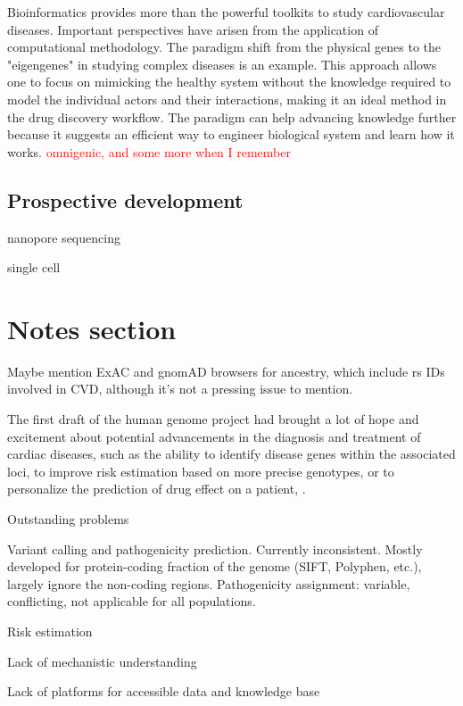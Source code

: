 \documentclass[letter]{bioinfo}
\newcommand{\comment}[1]{\textcolor{red}{#1}}
\begin{document}
	Bioinformatics provides more than the powerful toolkits to study cardiovascular diseases. Important perspectives have arisen from the application of computational methodology. The paradigm shift from the physical genes to the "eigengenes" in studying complex diseases \citep{Weiss:2012:Good} is an example. This approach allows one to focus on mimicking the healthy system without the knowledge required to model the individual actors and their interactions, making it an ideal method in the drug discovery workflow. The paradigm can help advancing knowledge further because it suggests an efficient way to engineer biological system and learn how it works.
	\comment{omnigenic, and some more when I remember}
	
	
	\subsection{Prospective development}
	
	nanopore sequencing
	
	single cell
	
	\section*{Notes section}
	
	Maybe mention ExAC and gnomAD browsers for ancestry, which include rs IDs involved in CVD, although it's not a pressing issue to mention.
	
	The first draft of the human genome project had brought a lot of hope and excitement about potential advancements in the diagnosis and treatment of cardiac diseases, such as the ability to identify disease genes within the associated loci, to improve risk estimation based on more precise genotypes, or to personalize the prediction of drug effect on a patient, \citep{Komajda:2001:heart}.
	
	
	Outstanding problems
	
	Variant calling and pathogenicity prediction. Currently inconsistent. Mostly developed for protein-coding fraction of the genome (SIFT, Polyphen, etc.), largely ignore the non-coding regions.
	Pathogenicity assignment: variable, conflicting, not applicable for all populations.
	
	Risk estimation
	
	Lack of mechanistic understanding
	
	Lack of platforms for accessible data and knowledge base
	
	
\end{document}

